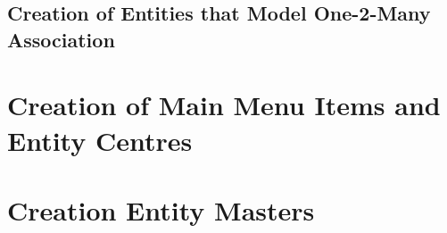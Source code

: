     
  \subsection{Creation of Entities that Model One-2-Many Association}  
  
\section{Creation of Main Menu Items and Entity Centres}  
  
  
\section{Creation Entity Masters}
  
